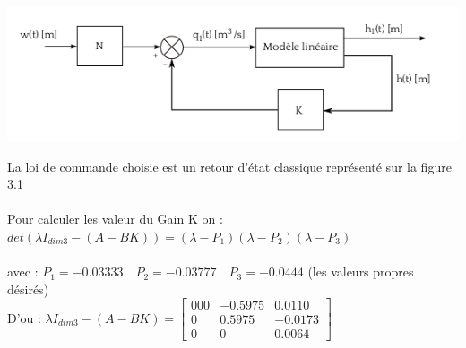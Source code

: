 \begin{center}
\includegraphics[scale=0.7]{fig2.png}
\label{fig2} 
\end{center}

La loi de commande choisie est un retour d'état classique représenté sur la figure 3.1 \\\\


Pour calculer les valeur du Gain K on :\\ 
$det(\lambda I_{dim3}-(A-BK))=(\lambda-P_{1})(\lambda-P_{2})(\lambda-P_{3})$\\\\

avec : $P_{1}=-0.03333 \quad P_{2}=-0.03777 \quad P_{3}=-0.0444$ (les valeurs propres désirés)\\

D'ou :    $\lambda I_{dim3}-(A-BK)=\begin{bmatrix} 
000 & -0.5975 & 0.0110 \\
0 & 0.5975 & -0.0173 \\
0 & 0 & 0.0064  
\end{bmatrix} $






